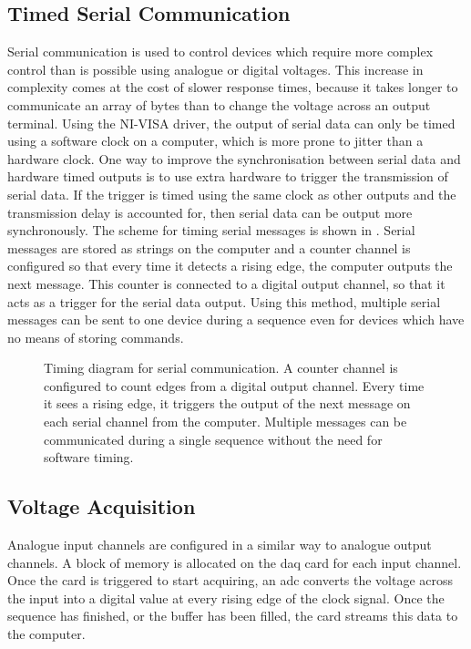 \subsection{Timed Serial Communication}\label{subsec:compinterface_serial}
Serial communication is used to control devices which require more complex
control than is possible using analogue or digital voltages. This increase in
complexity comes at the cost of slower response times, because it takes
longer to communicate an array of bytes than to change the voltage
across an output terminal. Using the NI-VISA driver, the output of serial
data can only be timed using a software clock on a computer, which is more
prone to jitter than a hardware clock. One way to improve the synchronisation
between serial data and hardware timed outputs is to use extra hardware to
trigger the transmission of serial data. If the trigger is timed using the
same clock as other outputs and the transmission delay is accounted for, then
serial data can be output more synchronously. The scheme for timing serial
messages is shown in . Serial messages are
stored as strings on the computer and a counter channel is configured so that
every time it detects a rising edge, the computer outputs the next message.
This counter is connected to a digital output channel, so that it acts as a
trigger for the serial data output. Using this method, multiple serial
messages can be sent to one device during a sequence even for devices which
have no means of storing commands.
\begin{figure}
    \centering
    
    \caption[Timing diagram for serial communication]{Timing diagram for
    serial communication. A counter channel is configured to count edges from
    a digital output channel. Every time it sees a rising edge, it triggers
    the output of the next message on each serial channel from the computer.
    Multiple messages can be communicated during a single sequence without
    the need for software timing.}\label{fig:serial_timing}
\end{figure} 
\subsection{Voltage Acquisition}\label{subsec:compinterface_mmacquisition}
Analogue input channels are configured in a similar way to analogue output
channels. A block of memory is allocated on the \ac{daq} card for each input
channel. Once the card is triggered to start acquiring, an \ac{adc} converts
the voltage across the input into a digital value at every rising edge of the
clock signal. Once the sequence has finished, or the buffer has been filled,
the card streams this data to the computer.

